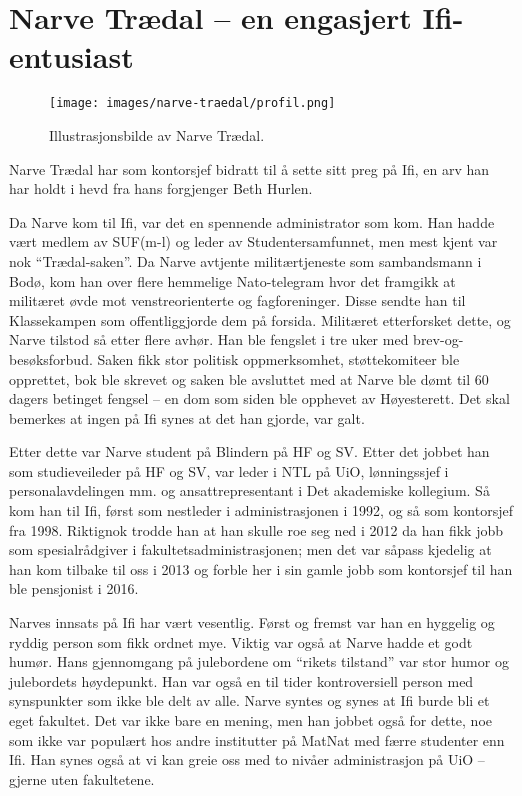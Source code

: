 \chapter{Narve Trædal -- en engasjert Ifi-entusiast}

\author{Skrevet av Dag Langmyhr og Arne Maus}

\begin{wrapfigure}{r}{5cm}
	\centering
	\texttt{[image: images/narve-traedal/profil.png]}
	\label{fig:narve-traedal}
	\caption{Illustrasjonsbilde av Narve Trædal.}
\end{wrapfigure}

Narve Trædal har som kontorsjef bidratt til å sette sitt preg på Ifi, en arv han har holdt i hevd fra hans forgjenger Beth Hurlen.

Da Narve kom til Ifi, var det en spennende administrator som kom. Han hadde vært medlem av SUF(m-l) og leder av Studentersamfunnet, men mest kjent var nok ``Trædal-saken''. Da Narve avtjente militærtjeneste som sambandsmann i Bodø, kom han over flere hemmelige Nato-telegram hvor det framgikk at militæret øvde mot venstreorienterte og fagforeninger. Disse sendte han til Klassekampen som offentliggjorde dem på forsida. Militæret etterforsket dette, og Narve tilstod så etter flere avhør. Han ble fengslet i tre uker med brev-og-besøksforbud. Saken fikk stor politisk oppmerksomhet, støttekomiteer ble opprettet, bok ble skrevet og saken ble avsluttet med at Narve ble dømt til 60 dagers betinget fengsel – en dom som siden ble opphevet av Høyesterett. Det skal bemerkes at ingen på Ifi synes at det han gjorde, var galt.

Etter dette var Narve student på Blindern på HF og SV. Etter det jobbet han som studieveileder på HF og SV, var leder i NTL på UiO, lønningssjef i personalavdelingen mm. og ansattrepresentant i Det akademiske kollegium. Så kom han til Ifi, først som nestleder i administrasjonen i 1992, og så som kontorsjef fra 1998. Riktignok trodde han at han skulle roe seg ned i 2012 da han fikk jobb som spesialrådgiver i fakultetsadministrasjonen; men det var såpass kjedelig at han kom tilbake til oss i 2013 og forble her i sin gamle jobb som kontorsjef til han ble pensjonist i 2016.

Narves innsats på Ifi har vært vesentlig. Først og fremst var han en hyggelig og ryddig person som fikk ordnet mye. Viktig var også at Narve hadde et godt humør. Hans gjennomgang på julebordene om ``rikets tilstand'' var stor humor og julebordets høydepunkt. Han var også en til tider kontroversiell person med synspunkter som ikke ble delt av alle. Narve syntes og synes at Ifi burde bli et eget fakultet. Det var ikke bare en mening, men han jobbet også for dette, noe som ikke var populært hos andre institutter på MatNat med færre studenter enn Ifi. Han synes også at vi kan greie oss med to nivåer administrasjon på UiO – gjerne uten fakultetene.

